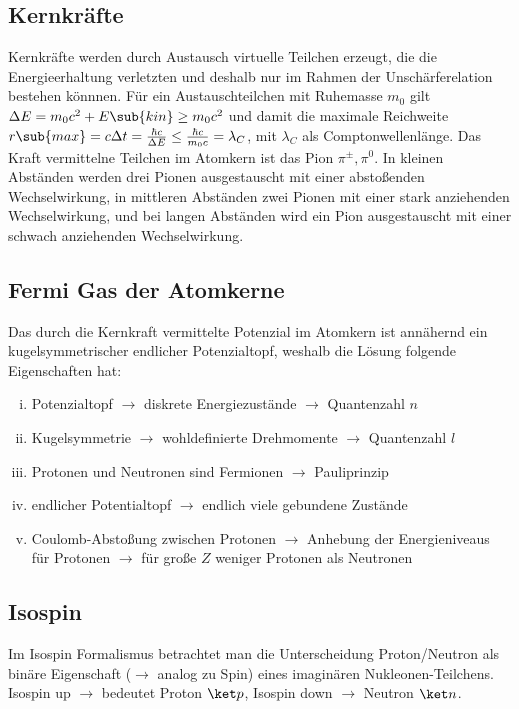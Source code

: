 \documentclass[twocolumn]{summery_4.1}
\begin{document}
\subsection{Kernkräfte}
Kernkräfte werden durch Austausch virtuelle Teilchen erzeugt, die die Energieerhaltung verletzten und deshalb nur im Rahmen der Unschärferelation bestehen könnnen. Für ein Austauschteilchen mit Ruhemasse \(m_0\) gilt
\(\Delta E = m_0 c^2 + E\sub{kin} \ge m_0 c^2\) und damit die maximale Reichweite
\(r\sub{max} = c\Delta t = \frac{\hbar c}{\Delta E} \le  \frac{\hbar c}{m_0 c} = \lambda_C\), mit \(\lambda_C\) als Comptonwellenlänge.  
Das Kraft vermittelne Teilchen im Atomkern ist das Pion \(\pi^\pm, \pi^0\).
In kleinen Abständen werden drei Pionen ausgestauscht mit einer abstoßenden Wechselwirkung, in mittleren Abständen zwei Pionen mit einer stark anziehenden Wechselwirkung, und bei langen Abständen wird ein Pion ausgestauscht mit einer schwach anziehenden Wechselwirkung.

\subsection{Fermi Gas der Atomkerne}
Das durch die Kernkraft vermittelte Potenzial im Atomkern ist annähernd ein kugelsymmetrischer endlicher Potenzialtopf, weshalb die Lösung folgende Eigenschaften hat:
\begin{enumerate}[(i)]
    \item Potenzialtopf \(\to\) diskrete Energiezustände \(\rightarrow \) Quantenzahl \(n\)
    \item Kugelsymmetrie \(\to\) wohldefinierte Drehmomente \(\rightarrow\) Quantenzahl \(l\)
    \item Protonen und Neutronen sind Fermionen \(\to\) Pauliprinzip
    \item endlicher Potentialtopf \(\to\) endlich viele gebundene Zustände
    \item Coulomb-Abstoßung zwischen Protonen \(\to\) Anhebung der Energieniveaus für Protonen \(\to\) für große \(Z\) weniger Protonen als Neutronen
\end{enumerate}

\subsection{Isospin}
Im Isospin Formalismus betrachtet man die Unterscheidung Proton/Neutron als binäre Eigenschaft (\(\to\) analog zu Spin) eines imaginären Nukleonen-Teilchens. Isospin up \(\to \) bedeutet Proton \(\ket p\), Isospin down \(\to \) Neutron \(\ket n\).
\end{document}
